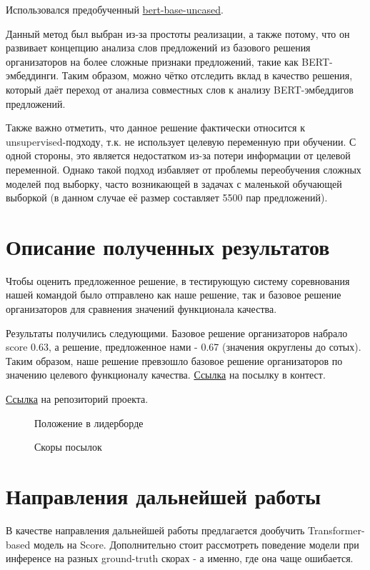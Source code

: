 \documentclass[12pt]{article}
\newcommand{\imgh}[3]
{
\begin{figure}[H]
\center{\texttt{[image: \#2]}}
\caption{#3}
\label{ris:#2}
\end{figure}
}
\begin{document}
Использовался предобученный \href{https://huggingface.co/bert-base-uncased}{bert-base-uncased}.

Данный метод был выбран из-за простоты реализации, а также потому, что он развивает концепцию анализа слов предложений из базового решения организаторов на более сложные признаки предложений, такие как BERT-эмбеддинги. Таким образом, можно чётко отследить вклад в качество решения, который даёт переход от анализа совместных слов к анализу BERT-эмбеддигов предложений.

Также важно отметить, что данное решение фактически относится к unsupervised-подходу, т.к. не использует целевую переменную при обучении. С одной стороны, это является недостатком из-за потери информации от целевой переменной. Однако такой подход избавляет от проблемы переобучения сложных моделей под выборку, часто возникающей в задачах с маленькой обучающей выборкой (в данном случае её размер составляет 5500 пар предложений).

\newpage


\section{Описание полученных результатов}
Чтобы оценить предложенное решение, в тестирующую систему соревнования нашей командой было отправлено как наше решение, так и базовое решение организаторов для сравнения значений функционала качества.

Результаты получились следующими. Базовое решение организаторов набрало score 0.63, а решение, предложенное нами - 0.67 (значения округлены до сотых). Таким образом, наше решение превзошло базовое решение организаторов по значению целевого функционалу качества. \href{https://codalab.lisn.upsaclay.fr/my/competition/submission/588203/detailed_results/}{Ссылка} на посылку в контест.

\href{https://github.com/wwwwwert/NLP_project}{Ссылка} на репозиторий проекта.

\imgh{12cm}{leaderboard.png}{Положение в лидерборде}
\imgh{12cm}{submits_scores.png}{Скоры посылок}

\section{Направления дальнейшей работы}
В качестве направления дальнейшей работы предлагается дообучить Transformer-based модель на Score. Дополнительно стоит рассмотреть поведение модели при инференсе на разных ground-truth скорах - а именно, где она чаще ошибается.
\end{document}
